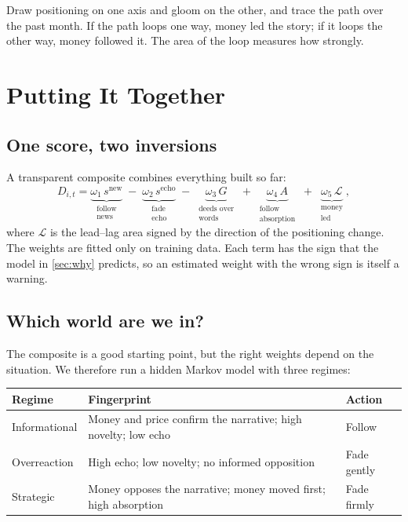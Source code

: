 \documentclass[11pt,a4paper]{article}
\theoremstyle{plain}
\theoremstyle{definition}
\begin{document}
\begin{plainwords}
Draw positioning on one axis and gloom on the other, and trace the path over the past month. If the path loops one way, money led the story; if it loops the other way, money followed it. The area of the loop measures how strongly.
\end{plainwords}

\section{Putting It Together}\label{sec:together}

\subsection{One score, two inversions}

A transparent composite combines everything built so far:
\begin{equation}
  D_{i,t} =
  \underbrace{\omega_1\, s^{\text{new}}}_{\substack{\text{follow}\\ \text{news}}}
  \;-\;\underbrace{\omega_2\, s^{\text{echo}}}_{\substack{\text{fade}\\ \text{echo}}}
  \;-\;\underbrace{\omega_3\, G}_{\substack{\text{deeds over}\\ \text{words}}}
  \;+\;\underbrace{\omega_4\, A}_{\substack{\text{follow}\\ \text{absorption}}}
  \;+\;\underbrace{\omega_5\, \mathcal{L}}_{\substack{\text{money}\\ \text{led}}} ,
\end{equation}
where $\mathcal{L}$ is the lead--lag area signed by the direction of the positioning change. The weights are fitted only on training data. Each term has the sign that the model in \cref{sec:why} predicts, so an estimated weight with the wrong sign is itself a warning.

\subsection{Which world are we in?}

The composite is a good starting point, but the right weights depend on the situation. We therefore run a hidden Markov model \citep{hamilton1989} with three regimes:

\begin{center}
\small
\begin{tabularx}{\textwidth}{@{}lXl@{}}
\toprule
Regime & Fingerprint & Action \\
\midrule
Informational & Money and price confirm the narrative; high novelty; low echo & Follow \\
Overreaction & High echo; low novelty; no informed opposition & Fade gently \\
Strategic & Money opposes the narrative; money moved first; high absorption & Fade firmly \\
\bottomrule
\end{tabularx}
\end{center}
\end{document}
